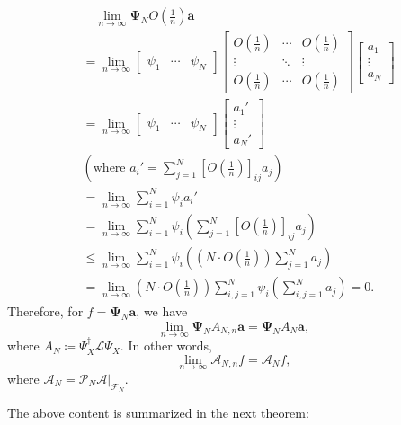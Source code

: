 \documentclass{article}[11]
\begin{document}
	\begin{align*}
		&\quad \lim_{n\to\infty} \mathbf{\Psi}_N O(\tfrac{1}{n})\mathbf{a} \\
		&= \lim_{n\to\infty} 
		\begin{bmatrix}
			\psi_1 & \cdots & \psi_N
		\end{bmatrix}
		\begin{bmatrix}
			O(\tfrac{1}{n}) & \cdots & O(\tfrac{1}{n}) \\
			\vdots & \ddots & \vdots \\
			O(\tfrac{1}{n}) & \cdots & O(\tfrac{1}{n})
		\end{bmatrix}
		\begin{bmatrix}
			a_1 \\
			\vdots \\
			a_N
		\end{bmatrix} \\
		&= \lim_{n\to\infty} 
		\begin{bmatrix}
			\psi_1 & \cdots & \psi_N
		\end{bmatrix}
		\begin{bmatrix}
			a_1' \\
			\vdots \\
			a_N'
		\end{bmatrix} \\
		&(\text{where $a_i'=\sum_{j=1}^N [O(\tfrac{1}{n})]_{ij}a_j$}) \\
		&= \lim_{n\to\infty} \sum_{i=1}^N \psi_i a_i' \\
		&= \lim_{n\to\infty} \sum_{i=1}^N \psi_i \left( \sum_{j=1}^N [O(\tfrac{1}{n})]_{ij}a_j \right) \\
		&\leq \lim_{n\to\infty} \sum_{i=1}^N \psi_i \left( \left(N \cdot O(\tfrac{1}{n})\right) \sum_{j=1}^N a_j \right) \\
		&= \lim_{n\to\infty} \left(N \cdot O(\tfrac{1}{n})\right) \sum_{i,j=1}^N \psi_i \left( \sum_{i,j=1}^N a_j \right) = 0.
	\end{align*}
	Therefore, for $f=\mathbf{\Psi}_N\mathbf{a}$, we have
	$$
	\lim_{n\to\infty} \mathbf{\Psi}_N A_{N,n} \mathbf{a} = \mathbf{\Psi}_N A_N \mathbf{a},
	$$ 
	where $A_N \coloneqq \Psi_X^{\dagger}\mathcal{L}\Psi_X$. In other words,
	$$
	\lim_{n\to\infty} \mathcal{A}_{N,n} f = \mathcal{A}_N f,
	$$
	where $\mathcal{A}_N = \mathcal{P}_N \mathcal{A}|_{\mathcal{F}_N}$.
	
	The above content is summarized in the next theorem:
	
\end{document}
